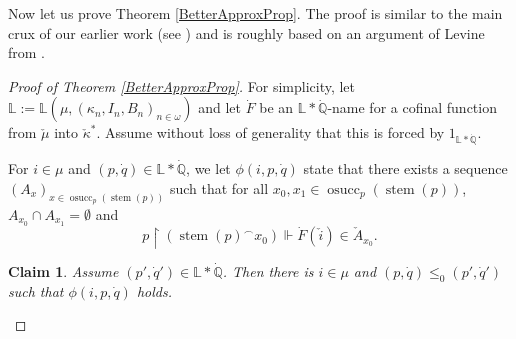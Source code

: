 \documentclass[a4paper]{amsart}
\theoremstyle{definition}
\theoremstyle{remark}
\theoremstyle{plain}
\newtheorem{myclaim}{Claim}
\numberwithin{mydef}{section}
\DeclareMathOperator{\stem}{stem}
\DeclareMathOperator{\osucc}{osucc}
\newcommand{\dL}{\mathbb{L}}
\newcommand{\dQ}{\mathbb{Q}}
\newcommand{\uhr}{\upharpoonright}
\begin{document}
	Now let us prove Theorem \ref{BetterApproxProp}. The proof is similar to the main crux of our earlier work (see \cite{JakobLevineFailureApproachability}) and is roughly based on an argument of Levine from \cite{LevineClassicalNamba}.
	
	\begin{proof}[Proof of Theorem \ref{BetterApproxProp}]
		For simplicity, let $\dL:=\dL(\mu,(\kappa_n,I_n,B_n)_{n\in\omega})$ and let $\dot{F}$ be an $\dL*\dot{\dQ}$-name for a cofinal function from $\check{\mu}$ into $\check{\kappa}^*$. Assume without loss of generality that this is forced by $1_{\dL*\dot{\dQ}}$.
		
		For $i\in\mu$ and $(p,\dot{q})\in\dL*\dot{\dQ}$, we let $\phi(i,p,\dot{q})$ state that there exists a sequence $(A_x)_{x\in\osucc_p(\stem(p))}$ such that for all $x_0,x_1\in\osucc_p(\stem(p))$, $A_{x_0}\cap A_{x_1}=\emptyset$ and
		$$p\uhr(\stem(p)^{\frown}x_0)\Vdash\dot{F}(\check{i})\in\check{A}_{x_0}.$$
		
		\setcounter{myclaim}{0}
		
		\begin{myclaim}
			Assume $(p',\dot{q}')\in\dL*\dot{\dQ}$. Then there is $i\in\mu$ and $(p,\dot{q})\leq_0(p',\dot{q}')$ such that $\phi(i,p,\dot{q})$ holds.
		\end{myclaim}
		

\end{proof}
\end{document}
